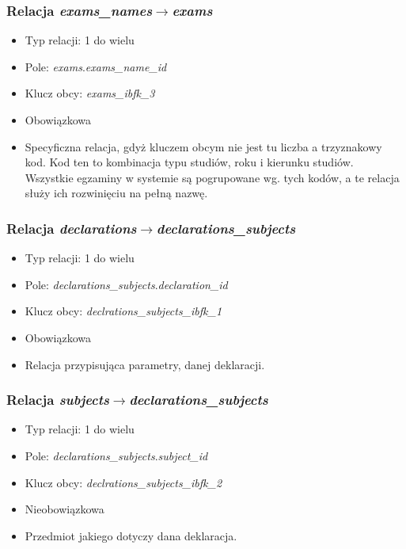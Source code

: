 \documentclass[a4paper,12pt,oneside]{report}
\begin{document}
\subsubsection{Relacja \emph{exams\_names}$\to$\emph{exams}}
\label{subsub:exams_names-exams}
\begin{itemize}
  \item Typ relacji: 1 do wielu
  \item Pole: \emph{exams}.\emph{exams\_name\_id}
  \item Klucz obcy: \emph{exams\_ibfk\_3}
  \item Obowiązkowa
  \item Specyficzna relacja, gdyż kluczem obcym nie jest tu liczba a trzyznakowy kod. Kod ten to kombinacja typu studiów, roku i kierunku studiów. Wszystkie egzaminy w systemie są pogrupowane wg. tych kodów, a te relacja służy ich rozwinięciu na pełną nazwę.
\end{itemize}

\subsubsection{Relacja \emph{declarations}$\to$\emph{declarations\_subjects}}
\label{subsub:declarations-declarations_subjects}
\begin{itemize}
  \item Typ relacji: 1 do wielu
  \item Pole: \emph{declarations\_subjects}.\emph{declaration\_id}
  \item Klucz obcy: \emph{declrations\_subjects\_ibfk\_1}
  \item Obowiązkowa
  \item Relacja przypisująca parametry, danej deklaracji.
\end{itemize}

\subsubsection{Relacja \emph{subjects}$\to$\emph{declarations\_subjects}}
\label{subsub:subjects-declarations_subjects}
\begin{itemize}
  \item Typ relacji: 1 do wielu
  \item Pole: \emph{declarations\_subjects}.\emph{subject\_id}
  \item Klucz obcy: \emph{declrations\_subjects\_ibfk\_2}
  \item Nieobowiązkowa
  \item Przedmiot jakiego dotyczy dana deklaracja.
\end{itemize}
\end{document}
